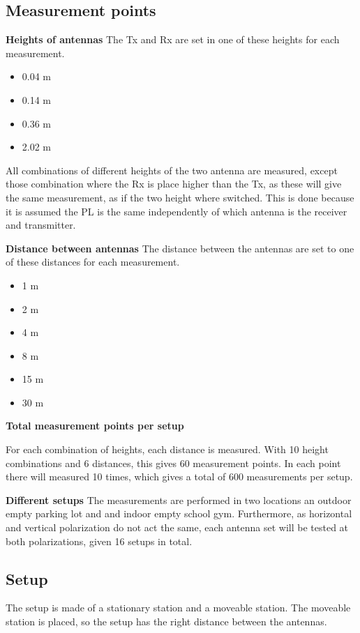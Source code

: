 \subsection*{Measurement points}

\textbf{Heights of antennas}
The Tx and Rx are set in one of these heights for each measurement. 

\begin{itemize}
\item 0.04 m
\item 0.14 m
\item 0.36 m
\item 2.02 m
\end{itemize}

All combinations of different heights of the two antenna are measured, except those combination where the Rx is place higher than the Tx, as these will give the same measurement, as if the two height where switched. This is done because it is assumed the PL is the same independently of which antenna is the receiver and transmitter.

\textbf{Distance between antennas}
The distance between the antennas are set to one of these distances for each measurement.

\begin{itemize}
\item 1 m
\item 2 m
\item 4 m
\item 8 m
\item 15 m
\item 30 m
\end{itemize}

\textbf{Total measurement points per setup}

For each combination of heights, each distance is measured. With 10 height combinations and 6 distances, this gives 60 measurement points. In each point there will measured 10 times, which gives a total of 600 measurements per setup.

\textbf{Different setups}
The measurements are performed in two locations an outdoor empty parking lot and and indoor empty school gym. Furthermore, as horizontal and vertical polarization do not act the same, each antenna set will be tested at both polarizations, given 16 setups in total.

\subsection*{Setup}
The setup is made of a stationary station and a moveable station. The moveable station is placed, so the setup has the right distance between the antennas.

